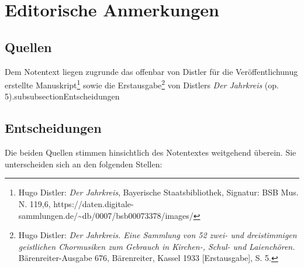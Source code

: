\documentclass{article}
\begin{document}
\section{Editorische Anmerkungen}
\begin{multicols}{2}

\subsection{Quellen}

Dem Notentext liegen zugrunde das offenbar von Distler für die
Veröffentlichunug erstellte Manuskript\footnote{Hugo Distler: \emph{Der
  Jahrkreis}, Bayerische Staatsbibliothek, Signatur: BSB Mus. N. 119,6,
  https://daten.digitale-sammlungen.de/\textasciitilde db/0007/bsb00073378/images/}
sowie die Erstausgabe\footnote{Hugo Distler: \emph{Der Jahrkreis. Eine
  Sammlung von 52 zwei- und dreistimmigen geistlichen Chormusiken zum
  Gebrauch in Kirchen-, Schul- und Laienchören.} Bärenreiter-Ausgabe
  676, Bärenreiter, Kassel 1933 {[}Erstausgabe{]}, S. 5.} von Distlers
\emph{Der Jahrkreis} (op. 5).subsubsection{Entscheidungen}

\subsection{Entscheidungen}

Die beiden Quellen stimmen hinsichtlich des Notentextes weitgehend
überein. Sie unterscheiden sich an den folgenden Stellen:



\end{multicols}
\end{document}
